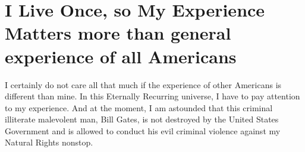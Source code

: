 \documentclass{amsart}
\begin{document}
\section{I Live Once, so My Experience Matters more than general experience of all Americans}

I certainly do not care all that much if the experience of other Americans is different than mine.  In this Eternally Recurring universe, I have to pay attention to my experience.  And at the moment, I am astounded that this criminal illiterate malevolent man, Bill Gates, is not destroyed by the United States Government and is allowed to conduct his evil criminal violence against my Natural Rights nonstop.
\end{document}
